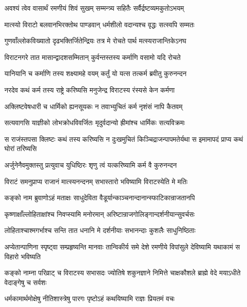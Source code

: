\twolineshloka
{अवश्यं त्वेव वासार्थं रमणीयं शिवं सुखम्}
{सम्मन्त्र्य सहितैः सर्वैर्द्रष्टव्यमकुतोऽभयम्}


\twolineshloka
{मात्स्यो विराटो बलवानभिरक्तोथ पाण्डवान्}
{धर्मशीलो वदान्यश्च वृद्धः सत्स्वपि सम्मतः}


\twolineshloka
{गुणवाँल्लोकविख्यातो दृढभक्तिर्जितेन्द्रियः}
{तत्र मे रोचते पार्थ मत्स्यराजान्तिकेऽनघ}


\twolineshloka
{विराटनगरे तात मासान्द्वादशसम्मितान्}
{कुर्वन्तस्तस्य कर्माणि वसामो यदि रोचते}


\twolineshloka
{यानियानि च कर्माणि तस्य शक्ष्यामहे वयम्}
{कर्तुं यो यत्स तत्कर्म ब्रवीतु कुरुनन्दन}



\twolineshloka
{नरदेव कथं कर्म तस्य राष्ट्रे करिष्यसि}
{मनुजेन्द्र विराटस्य रंस्यसे केन कर्मणा}


\twolineshloka
{अक्लिष्टवेषधारी च धार्मिको ह्यनसूयकः}
{न तवाभ्युचितं कर्म नृशंसं नापि कैतवम्}


\twolineshloka
{सत्यवागसि याज्ञीको लोभक्रोधविवर्जितः}
{मृदुर्वदान्यो ह्रीमांश्च धार्मिकः सत्यविक्रमः}


\threelineshloka
{स राजंस्तपसा क्लिष्टः कथं तस्य करिष्यसि}
{न दुःखमुचितं किञ्चिद्राजन्पापमतेर्यथा}
{स इमामापदं प्राप्य कथं घोरां तरिष्यसि}



\twolineshloka
{अर्जुनेनैवमुक्तस्तु प्रत्युवाच युधिष्ठिरः}
{शृणु त्वं यत्करिष्यामि कर्म वै कुरुनन्दन}


\twolineshloka
{विराटं समनुप्राप्य राजानं मात्स्यनन्दनम्}
{सभास्तारो भविष्यामि विराटस्येति मे मतिः}


\twolineshloka
{कङ्को नाम ब्रुवाणोऽहं मताक्षः साधुदेविता}
{वैडूर्यान्काञ्चनान्दानान्स्फाटिकान्राजतानपि}


\twolineshloka
{कृष्णाक्षाँल्लोहिताक्षांश्च निवप्स्यामि मनोरमान्}
{अरिष्टान्राजगोलिङ्गान्दर्शनीयान्सुवर्चसः}


\twolineshloka
{लोहिताश्चाश्मगर्भाश्च सन्ति तात धनानि मे}
{दर्शनीयाः सभानन्दाः कुशलैः साधुनिष्ठिताः}


\onelineshloka
{अप्येतान्पाणिना स्पृष्ट्वा सम्प्रहृष्यन्ति मानवाः}
\twolineshloka
{तान्विकीर्य समे देशे रमणीये विपांसुले}
{देविष्यामि यथाकामं स विहारो भविष्यति}


\threelineshloka
{कङ्को नाम्ना परिव्राट् च विराटस्य सभासदः}
{ज्योतिषे शकुनज्ञाने निमित्ते चाक्षकौशले}
{ब्राह्मे वेदे मयाऽधीते वेदाङ्गेषु च सर्वशः}


\twolineshloka
{धर्मकामार्थमोक्षेषु नीतिशास्त्रेषु पारगः}
{पृष्टोऽहं कथयिष्यामि राज्ञः प्रियतमं वचः}


